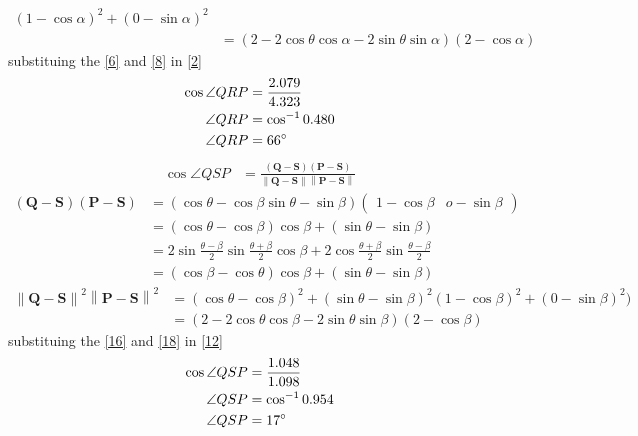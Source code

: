 \documentclass[12pt]{article}
\providecommand{\brak}[1]{\ensuremath{\left(#1\right)}}
\providecommand{\norm}[1]{\left\lVert#1\right\rVert}
\newcommand{\myvec}[1]{\ensuremath{\begin{pmatrix}#1\end{pmatrix}}}
\let\vec\mathbf
\begin{document}
\begin{enumerate}
\begin{align}
	\brak{1-\cos\alpha}^2+\brak{0-\sin\alpha}^2\\
	&=\brak{2-2\cos\theta\cos\alpha-2\sin\theta\sin\alpha}\brak{2-\cos\alpha}\label{8}
\end{align}
substituing the \eqref{6} and \eqref{8} in \eqref{2}
\begin{align}
\cos\angle QRP&=\frac{2.079}{4.323}\\
\angle QRP&=\cos^{-1}0.480\\
\angle QRP&=66\degree
\end{align}
\begin{align}
\cos\angle QSP&= \frac{\brak{\vec{Q}-\vec{S}}\brak{\vec{P}-\vec{S}}}{\norm{\vec{Q}-\vec{S}}\norm{\vec{P}-\vec{S}}}\label{12}
\end{align}
\begin{align}
\brak{\vec{Q}-\vec{S}}\brak{\vec{P}-\vec{S}}&= \brak{\cos\theta-\cos\beta \sin\theta-\sin\beta}\myvec{1-\cos\beta &o-\sin\beta}\\
&=\brak{\cos\theta-\cos\beta}\cos\beta+\brak{\sin\theta-\sin\beta}\\
&=2\sin\frac{\theta-\beta}{2}\sin\frac{\theta+\beta}{2}\cos\beta+2\cos\frac{\theta+\beta}{2}\sin\frac{\theta-\beta}{2}\\
&=\brak{\cos\beta-\cos\theta}\cos\beta+\brak{\sin\theta-\sin\beta}\label{16}
\end{align}
\begin{align}
\norm{\vec{Q}-\vec{S}}^2\norm{\vec{P}-\vec{S}}^2 &= \brak{\cos\theta-\cos\beta}^2+\brak{\sin\theta-\sin\beta}^2
	\brak{1-\cos\beta}^2+\brak{0-\sin\beta}^2)\\
	&=\brak{2-2\cos\theta\cos\beta-2\sin\theta\sin\beta}\brak{2-\cos\beta}\label{18}
\end{align}
substituing the \eqref{16} and \eqref{18} in \eqref{12}
\begin{align}
\cos\angle QSP&=\frac{1.048}{1.098}\\
\angle QSP&=\cos^{-1}0.954\\
\angle QSP&=17\degree
\end{align}
\end{enumerate}
\end{document}

